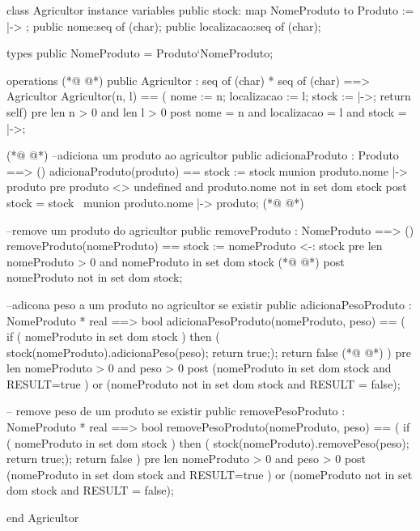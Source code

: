 \begin{vdmpp}[breaklines=true]
class Agricultor
instance variables
  public stock: map NomeProduto to Produto := { |-> };
  public nome:seq of (char);
  public localizacao:seq of (char);

types 
 public NomeProduto = Produto`NomeProduto;

operations
(*@
\label{Agricultor:11}
@*)
  public  Agricultor : seq of (char) * seq of (char) ==> Agricultor
   Agricultor(n, l) == ( nome := n; localizacao := l; stock := {|->}; return self)
  pre len n > 0 and len l > 0
  post nome = n and localizacao = l and stock = {|->};
 
(*@
\label{adicionaProduto:16}
@*)
 --adiciona um produto ao agricultor
  public  adicionaProduto : Produto ==> ()
   adicionaProduto(produto) == stock := stock munion {produto.nome |-> produto}
  pre produto <> undefined and produto.nome not in set dom stock
  post  stock = stock~ munion {produto.nome |-> produto};
(*@
\label{removeProduto:21}
@*)

 --remove um produto do agricultor
  public removeProduto : NomeProduto ==> ()
   removeProduto(nomeProduto) == stock := {nomeProduto} <-: stock
  pre len nomeProduto > 0 and nomeProduto in set dom stock
(*@
\label{adicionaPesoProduto:26}
@*)
  post nomeProduto not in set dom stock;
  
  --adicona peso a um produto no agricultor se existir 
  public  adicionaPesoProduto : NomeProduto * real ==> bool
  adicionaPesoProduto(nomeProduto, peso) == 
   (
    if ( nomeProduto in set dom stock ) 
     then  ( stock(nomeProduto).adicionaPeso(peso); return true;);
    return false
(*@
\label{removePesoProduto:35}
@*)
   )
  pre len nomeProduto > 0 and peso > 0
  post (nomeProduto in set dom stock and RESULT=true ) or (nomeProduto not in set dom stock and RESULT = false);
  
  
  -- remove peso de um produto se existir 
  public  removePesoProduto : NomeProduto * real ==> bool
  removePesoProduto(nomeProduto, peso) ==
    (
    if ( nomeProduto in set dom stock ) 
     then  ( stock(nomeProduto).removePeso(peso); return true;);
    return false
   )
  pre len nomeProduto > 0 and peso > 0
  post (nomeProduto in set dom stock and RESULT=true ) or (nomeProduto not in set dom stock and RESULT = false);


end Agricultor
\end{vdmpp}
\bigskip
